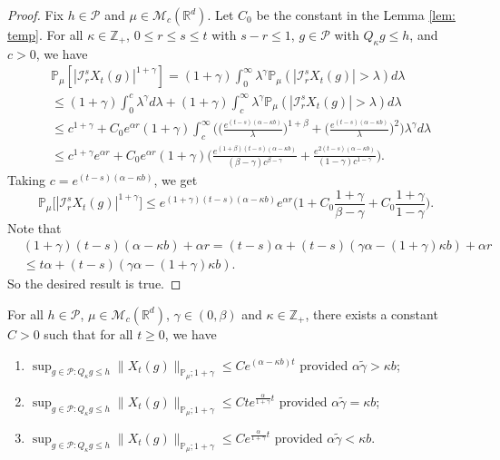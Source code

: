 \documentclass[EJP]{ejpecp} %
\begin{document}
\begin{proof}
	Fix $h \in \mathcal P$ and $\mu \in \mathcal M_c(\mathbb R^d)$. Let $C_0$ be the constant in the Lemma \ref{lem: temp}.
	For all $\kappa \in \mathbb Z_+$,  $0\leq r\leq s\leq t$ with $s-r \leq 1$,  $g\in \mathcal P$ with $Q_{\kappa} g \leq h$, and $c>0$, we have
\begin{align}
   	& \mathbb P_\mu[|\mathcal I_r^sX_t(g)|^{1+\gamma}]
   	= (1+\gamma)\int_0^\infty \lambda^{\gamma} \mathbb P_{\mu}(|\mathcal I_r^sX_t(g)|>\lambda) d\lambda \\
  	& \leq (1+\gamma)\int_0^c \lambda^{\gamma} d\lambda +(1+\gamma)\int_c^\infty \lambda^{\gamma}\mathbb P_\mu(|\mathcal I_r^sX_t(g)|> \lambda) d\lambda \\
    & \leq c^{1+\gamma} + C_0  e^{\alpha r}(1+\gamma)\int_c^\infty \bigg(\Big(\frac{e^{(t-s)(\alpha - \kappa b)}}{\lambda}\Big)^{1+\beta}+\Big(\frac{e^{(t-s)(\alpha - \kappa b)}}{\lambda}\Big)^{2}\bigg)\lambda^{\gamma}d\lambda \\
    & \leq c^{1+\gamma} e^{\alpha r} + C_0e^{\alpha r}(1+\gamma)\Big(  \frac{e^{(1+\beta)(t-s)(\alpha- \kappa b)}}{(\beta - \gamma)c^{\beta - \gamma}}  + \frac{e^{2(t-s)(\alpha- \kappa b)}}{(1 - \gamma)c^{1 - \gamma}} \Big).
\end{align}
	Taking $c = e^{(t-s)(\alpha- \kappa b)}$, we get
\begin{equation}
	\mathbb P_\mu\big[|\mathcal I_r^s X_t(g)|^{1+\gamma}\big]
  	\leq e^{(1+\gamma)(t-s)(\alpha- \kappa b)} e^{\alpha r}\Big(1+ C_0 \frac{1+\gamma}{\beta - \gamma}+ C_0 \frac{1+\gamma}{1 - \gamma}\Big).
\end{equation}
	Note that
\begin{align}
    & (1+\gamma) (t-s) (\alpha- \kappa b) + \alpha r
    = (t-s)\alpha+(t-s) (\gamma \alpha- (1+\gamma )\kappa b)+\alpha r \\
    & \leq t\alpha+(t-s) (\gamma \alpha- (1+\gamma)\kappa b).
\end{align}
	So the desired result is true.
\end{proof}

\begin{lemma}
\label{lem:P:M:uc}
	For all $h \in \mathcal P$, $\mu \in \mathcal M_c(\mathbb R^d)$, $\gamma\in (0, \beta)$ and $\kappa \in \mathbb Z_+$, there exists a constant $C > 0$ such that for all $t\geq 0$, we have
\begin{enumerate}
\item\label{item:P:M:uc:1}
    $\sup_{g\in \mathcal P: Q_\kappa g \leq h}\|X_t(g)\|_{\mathbb{P}_{\mu};1+\gamma}\leq C e^{(\alpha-\kappa b)t}$ provided $\alpha \tilde \gamma > \kappa b$;
\item \label{item:P:M:uc:2}
    $\sup_{g\in \mathcal P: Q_\kappa g \leq h}\|X_t(g)\|_{\mathbb{P}_{\mu};1+\gamma}\leq C te^{\frac{\alpha}{1+\gamma}t}$ provided $\alpha \tilde \gamma = \kappa b$;
\item \label{item:P:M:uc:3}
    $\sup_{g\in \mathcal P: Q_\kappa g \leq h} \|X_t(g)\|_{\mathbb{P}_{\mu};1+\gamma}\leq C e^{\frac{\alpha}{1+\gamma}t}$ provided $\alpha \tilde \gamma < \kappa b$.
\end{enumerate}
\end{lemma}
\end{document}
